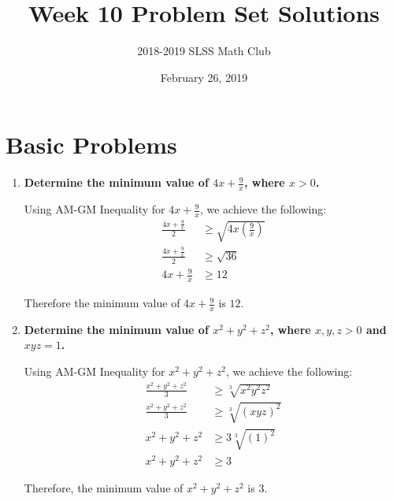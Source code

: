 \documentclass[12pt]{article}
\title{Week 10 Problem Set Solutions\vspace{-3mm}}
\author{2018-2019 SLSS Math Club\vspace{-5mm}}
\date{February 26, 2019\vspace{-5mm}}
\begin{document}
\maketitle

\section*{Basic Problems}
\begin{enumerate}
    \item \textbf{Determine the minimum value of $4x + \frac{9}{x}$, where $x > 0$.}
    
    Using AM-GM Inequality for $4x + \frac{9}{x}$, we achieve the following:
    \begin{align*}
        \frac{4x + \frac{9}{x}}{2} &\geq \sqrt{4x(\tfrac{9}{x})} \\
        \frac{4x + \frac{9}{x}}{2} &\geq \sqrt{36} \\
        4x + \frac{9}{x} &\geq 12
    \end{align*}
    
    Therefore the minimum value of $4x + \frac{9}{x}$ is $12$.
    
    \item \textbf{Determine the minimum value of $x^2 + y^2 + z^2$, where $x, y, z > 0$ and $xyz = 1$.} 
    
    Using AM-GM Inequality for $x^2 + y^2 + z^2$, we achieve the following:
    \begin{align*}
        \frac{x^2 + y^2 + z^2}{3} &\geq \sqrt[3]{x^2y^2z^2} \\
        \frac{x^2 + y^2 + z^2}{3} &\geq \sqrt[3]{(xyz)^2} \\
        x^2 + y^2 + z^2 &\geq 3 \sqrt[3]{(1)^2} \\
        x^2 + y^2 + z^2 &\geq 3
    \end{align*}
    
    Therefore, the minimum value of $x^2 + y^2 + z^2$ is $3$.
\end{enumerate}
\end{document}
